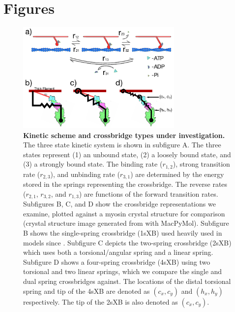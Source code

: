 \documentclass[]{article}
\begin{document}


\clearpage
\section*{Figures} %

\begin{figure}[htbp]
    \begin{center}
    \includegraphics[width=3.2in]{../imgs/Figure1.pdf}
    \caption{
        \label{fig_xb_types}
        \textbf{Kinetic scheme and crossbridge types under investigation.} 
        The three state kinetic system is shown in subfigure A. 
        The three states represent (1) an unbound state, (2) a loosely bound state, and (3) a strongly bound state. 
        The binding rate ($r_{1,2}$), strong transition rate ($r_{2,3}$), and unbinding rate ($r_{3,1}$) are determined by the energy stored in the springs representing the crossbridge. 
        The reverse rates ($r_{2,1}$, $r_{3,2}$, and $r_{1,3}$) are functions of the forward transition rates.
        Subfigures B, C, and D show the crossbridge representations we examine, plotted against a myosin crystal structure for comparison (crystal structure image generated from \citet{Gourinath2003} with MacPyMol). 
        Subfigure B shows the single-spring crossbridge (1sXB) used heavily used in models since \protect\citep{Huxley1957}. 
        Subfigure C depicts the two-spring crossbridge (2sXB) which uses both a torsional/angular spring and a linear spring. 
        Subfigure D shows a four-spring crossbridge (4sXB) using two torsional and two linear springs, which we compare the single and dual spring crossbridges against. 
        The locations of the distal torsional spring and tip of the 4sXB are denoted as $(c_x, c_y)$ and $(h_x, h_y)$ respectively. 
        The tip of the 2sXB is also denoted as $(c_x, c_y)$.
    }
    \end{center}
\end{figure}
\end{document}
